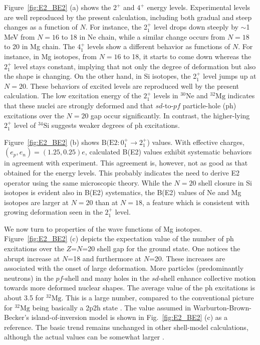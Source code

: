 \documentclass[aps,prl,twocolumn,groupedaddress,showkeys,showpacs,floatfix,superscriptaddress]{revtex4-1}
\def\Nu#1#2#3{{}^{#2}_{#3}\mathrm{#1}}
\newcommand\+{^\dagger}
\begin{document}
Figure~\ref{fig:E2_BE2} (a) shows the $2^{+}$ and $4^{+}$ energy levels.
Experimental levels are well reproduced by the present calculation, including 
both gradual and steep changes as a function of $N$.
 For instance, the 2$^+_1$ level drops down steeply
by $\sim$1 MeV from $N=16$ to 18 in Ne chain, while a similar 
change occurs from $N=18$ to 20 in Mg chain.  
The $4^{+}_1$ levels show a different behavior as functions of $N$.
For instance, in Mg isotopes, from $N=16$ to 18, it starts to come down whereas
the $2^{+}_1$ level stays constant, implying that 
not only the degree of deformation but also the shape is changing.
On the other hand, in Si isotopes, the 2$^+_1$ level jumps up at $N=20$.  
These behaviors of excited levels are reproduced well 
by the present calculation.  
The low excitation energy of the $2^{+}_1$ levels in $\Nu{Ne}{30}{}$ and 
$\Nu{Mg}{32}{}$ indicates that these nuclei are strongly deformed and that 
$sd$-to-$pf$ particle-hole (ph) excitations over the $N=20$ gap occur significantly.  
In contrast, the higher-lying $2^{+}_1$ level of $\Nu{Si}{34}{}$
suggests weaker degrees of ph excitations.

Figure~\ref{fig:E2_BE2} (b) shows 
$\mathrm{B(E2}: 0_1^{+}\rightarrow 2_1^{+}$) values. 
With effective charges, $(e_p,e_n)=(1.25, 0.25)e$,  
calculated B(E2) values exhibit systematic behaviors in agreement with experiment. 
This agreement is, however, not as good as that obtained for the energy levels.  
This probably indicates the need to derive E2 operator using the same microscopic theory.
While the $N=20$ shell closure in Si isotopes is evident also in B(E2) systematics, 
the B(E2) values of Ne and Mg isotopes are larger at $N=20$ 
than at $N=18$, a feature which is consistent with growing deformation %
seen in the $2^{+}_1$ level.

We now turn to properties of the wave functions of Mg isotopes.  Figure~\ref{fig:E2_BE2} (c) 
depicts the expectation value of the number of ph excitations over the $Z$=$N$=20 
shell gap for the ground state.  One notices the abrupt increase 
at $N$=18 and furthermore at $N$=20.  These increases are associated with the onset of large deformation.
More particles (predominantly neutrons) in the $pf$-shell and many holes in the $sd$-shell enhance   
collective motion towards more deformed nuclear shapes.
The average value of the ph excitations is about 3.5 for $\Nu{Mg}{32}{}$.  This is a large number, 
compared to the conventional picture for $\Nu{Mg}{32}{}$ being basically a 2p2h state 
\cite{Warburton:1990vw,Fukunishi:1992ic,PhysRevC.60.054315,Caurier:2013aoa,RevModPhys.77.427}.  
The value assumed in Warburton-Brown-Becker's island-of-inversion model \cite{Warburton:1990vw} 
is shown in Fig.~\ref{fig:E2_BE2} (c) as a reference.  The basic trend remains unchanged in other shell-model 
calculations, although the actual values can be somewhat larger \cite{Fukunishi:1992ic,PhysRevC.60.054315,Caurier:2013aoa,RevModPhys.77.427}.  
\end{document}
